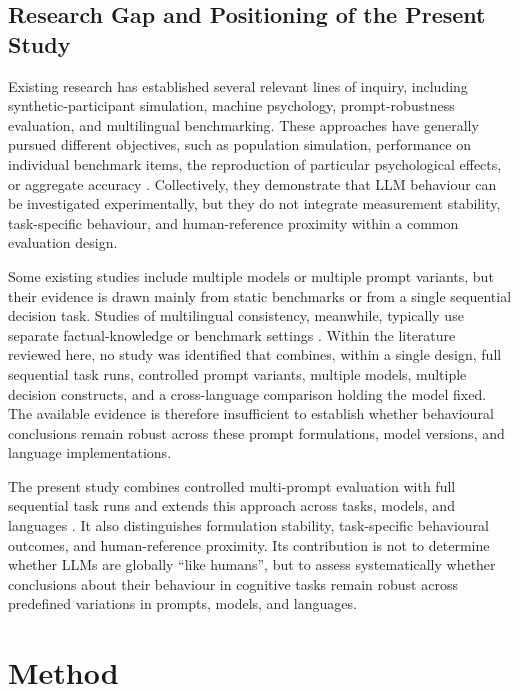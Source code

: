 \documentclass[logo,msc]{infthesis}
\begin{document}
\section{Research Gap and Positioning of the Present Study}

Existing research has established several relevant lines of inquiry, including synthetic-participant simulation, machine psychology, prompt-robustness evaluation, and multilingual benchmarking. These approaches have generally pursued different objectives, such as population simulation, performance on individual benchmark items, the reproduction of particular psychological effects, or aggregate accuracy \cite{Dillion2023ReplaceParticipants,Hagendorff2023MachinePsychology,Mizrahi2024MultiPrompt,Zhang2023M3Exam}. Collectively, they demonstrate that LLM behaviour can be investigated experimentally, but they do not integrate measurement stability, task-specific behaviour, and human-reference proximity within a common evaluation design.

Some existing studies include multiple models or multiple prompt variants, but their evidence is drawn mainly from static benchmarks or from a single sequential decision task. Studies of multilingual consistency, meanwhile, typically use separate factual-knowledge or benchmark settings \cite{Loya2023PromptSensitivityDecision,Sclar2024PromptFormatting,Qi2023CrossLingualConsistency}. Within the literature reviewed here, no study was identified that combines, within a single design, full sequential task runs, controlled prompt variants, multiple models, multiple decision constructs, and a cross-language comparison holding the model fixed. The available evidence is therefore insufficient to establish whether behavioural conclusions remain robust across these prompt formulations, model versions, and language implementations.

The present study combines controlled multi-prompt evaluation with full sequential task runs and extends this approach across tasks, models, and languages \cite{Loya2023PromptSensitivityDecision,Sclar2024PromptFormatting,Mizrahi2024MultiPrompt}. It also distinguishes formulation stability, task-specific behavioural outcomes, and human-reference proximity. Its contribution is not to determine whether LLMs are globally ``like humans'', but to assess systematically whether conclusions about their behaviour in cognitive tasks remain robust across predefined variations in prompts, models, and languages.
\chapter{Method}
\end{document}
